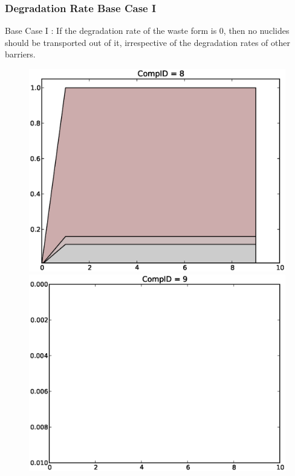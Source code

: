 \begin{frame}
  \frametitle{Degradation Rate Base Case I}
  Base Case I : If the degradation rate of the waste form is 0, then no nuclides should be 
  transported out of it, irrespective of the degradation rates of other 
  barriers. 

  \begin{figure}[htbp!]
    \begin{center}
      \includegraphics[width=.5\textwidth]{cyder/images/0deg_comp8.eps}
      \includegraphics[width=.5\textwidth]{cyder/images/0deg_comp9.eps}
    \end{center}
  \end{figure}
\end{frame}

